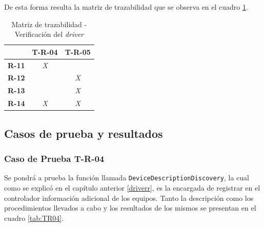 De esta forma resulta la matriz de trazabilidad que se observa en el cuadro \ref{tab:matriz_driver}.


\begin{table}[!h]
    \centering
    \begin{tabular}{|c|c|c|}
        \hline
        \textbf{}     & \textbf{T-R-04} & \textbf{T-R-05} \\ \hline
        \textbf{R-11} & \textit{X}      & \textit{}       \\ \hline
        \textbf{R-12} & \textit{}       & \textit{X}      \\ \hline
        \textbf{R-13} & \textit{}       & \textit{X}      \\ \hline
        \textbf{R-14} & \textit{X}      & \textit{X}      \\ \hline
        \end{tabular}
    \caption{Matriz de trazabilidad - Verificación del \textit{driver}}
    \label{tab:matriz_driver}
\end{table}

\subsection{Casos de prueba y resultados}

\subsubsection{Caso de Prueba T-R-04}

Se pondrá a prueba la función llamada \texttt{DeviceDescriptionDiscovery}, la cual como se explicó en el capítulo anterior \ref{driverr}, es la encargada de registrar en el controlador información adicional de los equipos. Tanto la descripción como los procedimientos llevados a cabo y los resultados de los mismos se presentan en el cuadro \ref{tab:TR04}. 

